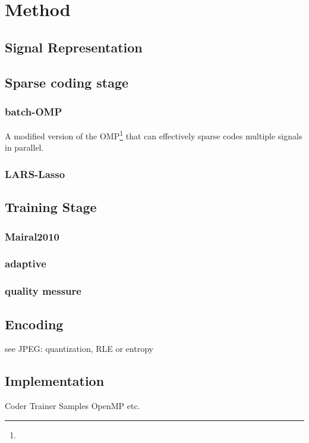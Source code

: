 \chapter{Method}


\section{Signal Representation}

\section{Sparse coding stage}
\subsection{batch-OMP}
A modified version of the OMP\footnote{} that can effectively sparse codes multiple signals in parallel.

\subsection{LARS-Lasso}

\section{Training Stage}
\subsection{Mairal2010}

\subsection{adaptive}

\subsection{quality messure}

\section{Encoding}
see JPEG: quantization, RLE or entropy


\section{Implementation}


Coder
Trainer
Samples
OpenMP
etc.


